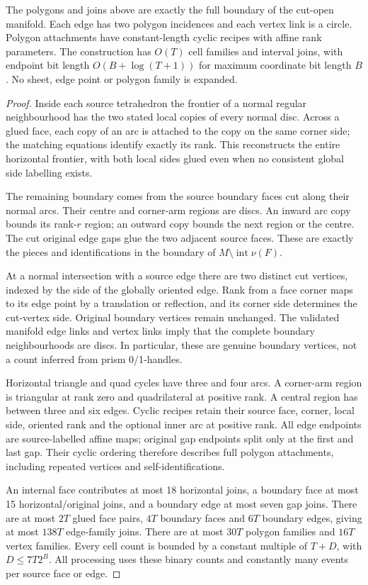 \begin{proposition}
The polygons and joins above are exactly the full boundary of the cut-open
manifold. Each edge has two polygon incidences and each vertex link is a
circle. Polygon attachments have constant-length cyclic recipes with affine
rank parameters. The construction has $O(T)$ cell families and interval
joins, with endpoint bit length $O(B+\log(T+1))$ for maximum coordinate bit
length $B$. No sheet, edge point or polygon family is expanded.
\end{proposition}
\begin{proof}
Inside each source tetrahedron the frontier of a normal regular neighbourhood
has the two stated local copies of every normal disc. Across a glued face,
each copy of an arc is attached to the copy on the same corner side; the
matching equations identify exactly its rank. This reconstructs the entire
horizontal frontier, with both local sides glued even when no consistent
global side labelling exists.

The remaining boundary comes from the source boundary faces cut along their
normal arcs. Their centre and corner-arm regions are discs. An inward arc
copy bounds its rank-$r$ region; an outward copy bounds the next region or
the centre. The cut original edge gaps glue the two adjacent source faces.
These are exactly the pieces and identifications in the boundary of
$M\setminus\operatorname{int}\nu(F)$.

At a normal intersection with a source edge there are two distinct cut
vertices, indexed by the side of the globally oriented edge. Rank from a
face corner maps to its edge point by a translation or reflection, and its
corner side determines the cut-vertex side. Original boundary vertices
remain unchanged. The validated manifold edge links and vertex links imply
that the complete boundary neighbourhoods are discs. In particular, these
are genuine boundary vertices, not a count inferred from prism 0/1-handles.

Horizontal triangle and quad cycles have three and four arcs. A corner-arm
region is triangular at rank zero and quadrilateral at positive rank. A
central region has between three and six edges. Cyclic recipes retain their
source face, corner, local side, oriented rank and the optional inner arc
at positive rank. All edge endpoints are source-labelled affine maps;
original gap endpoints split only at the first and last gap. Their cyclic
ordering therefore describes full polygon attachments, including repeated
vertices and self-identifications.

An internal face contributes at most 18 horizontal joins, a boundary face
at most 15 horizontal/original joins, and a boundary edge at most seven
gap joins. There are at most $2T$ glued face pairs, $4T$ boundary faces
and $6T$ boundary edges, giving at most $138T$ edge-family joins. There
are at most $30T$ polygon families and $16T$ vertex families. Every cell
count is bounded by a constant multiple of $T+D$, with
$D\le7T2^B$. All processing uses these binary counts and constantly many
events per source face or edge.
\end{proof}

